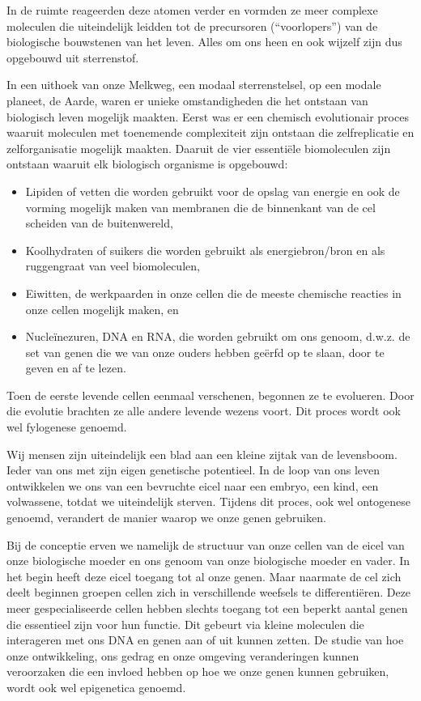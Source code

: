 \documentclass[
  11pt,
]{book}
\providecommand{\tightlist}{%
  \setlength{\itemsep}{0pt}\setlength{\parskip}{0pt}}
\begin{document}
In de ruimte reageerden deze atomen verder en vormden ze meer complexe moleculen die uiteindelijk leidden tot de precursoren (``voorlopers'') van de biologische bouwstenen van het leven. Alles om ons heen en ook wijzelf zijn dus opgebouwd uit sterrenstof.

In een uithoek van onze Melkweg, een modaal sterrenstelsel, op een modale planeet, de Aarde, waren er unieke omstandigheden die het ontstaan van biologisch leven mogelijk maakten. Eerst was er een chemisch evolutionair proces waaruit moleculen met toenemende complexiteit zijn ontstaan die zelfreplicatie en zelforganisatie mogelijk maakten. Daaruit de vier essentiële biomoleculen zijn ontstaan waaruit elk biologisch organisme is opgebouwd:

\begin{itemize}
\tightlist
\item
  Lipiden of vetten die worden gebruikt voor de opslag van energie en ook de vorming mogelijk maken van membranen die de binnenkant van de cel scheiden van de buitenwereld,
\item
  Koolhydraten of suikers die worden gebruikt als energiebron/bron en als ruggengraat van veel biomoleculen,
\item
  Eiwitten, de werkpaarden in onze cellen die de meeste chemische reacties in onze cellen mogelijk maken, en
\item
  Nucleïnezuren, DNA en RNA, die worden gebruikt om ons genoom, d.w.z. de set van genen die we van onze ouders hebben geërfd op te slaan, door te geven en af te lezen.
\end{itemize}

Toen de eerste levende cellen eenmaal verschenen, begonnen ze te evolueren. Door die evolutie brachten ze alle andere levende wezens voort. Dit proces wordt ook wel fylogenese genoemd.

Wij mensen zijn uiteindelijk een blad aan een kleine zijtak van de levensboom. Ieder van ons met zijn eigen genetische potentieel. In de loop van ons leven ontwikkelen we ons van een bevruchte eicel naar een embryo, een kind, een volwassene, totdat we uiteindelijk sterven. Tijdens dit proces, ook wel ontogenese genoemd, verandert de manier waarop we onze genen gebruiken.

Bij de conceptie erven we namelijk de structuur van onze cellen van de eicel van onze biologische moeder en ons genoom van onze biologische moeder en vader. In het begin heeft deze eicel toegang tot al onze genen. Maar naarmate de cel zich deelt beginnen groepen cellen zich in verschillende weefsels te differentiëren. Deze meer gespecialiseerde cellen hebben slechts toegang tot een beperkt aantal genen die essentieel zijn voor hun functie. Dit gebeurt via kleine moleculen die interageren met ons DNA en genen aan of uit kunnen zetten. De studie van hoe onze ontwikkeling, ons gedrag en onze omgeving veranderingen kunnen veroorzaken die een invloed hebben op hoe we onze genen kunnen gebruiken, wordt ook wel epigenetica genoemd.
\end{document}

